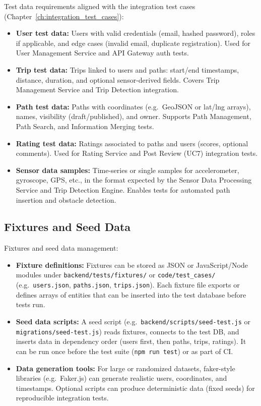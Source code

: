 Test data requirements aligned with the integration test cases (Chapter~\ref{ch:integration_test_cases}):
\begin{itemize}
    \item \textbf{User test data:} Users with valid credentials (email, hashed password), roles if applicable, and edge cases (invalid email, duplicate registration). Used for User Management Service and API Gateway auth tests.
    \item \textbf{Trip test data:} Trips linked to users and paths: start/end timestamps, distance, duration, and optional sensor-derived fields. Covers Trip Management Service and Trip Detection integration.
    \item \textbf{Path test data:} Paths with coordinates (e.g.\ GeoJSON or lat/lng arrays), names, visibility (draft/published), and owner. Supports Path Management, Path Search, and Information Merging tests.
    \item \textbf{Rating test data:} Ratings associated to paths and users (scores, optional comments). Used for Rating Service and Post Review (UC7) integration tests.
    \item \textbf{Sensor data samples:} Time-series or single samples for accelerometer, gyroscope, GPS, etc., in the format expected by the Sensor Data Processing Service and Trip Detection Engine. Enables tests for automated path insertion and obstacle detection.
\end{itemize}

\subsection{Fixtures and Seed Data}
\label{subsec:fixtures_seed_data}%

Fixtures and seed data management:
\begin{itemize}
    \item \textbf{Fixture definitions:} Fixtures can be stored as JSON or JavaScript/Node modules under \texttt{backend/tests/fixtures/} or \texttt{code/test\_cases/} (e.g.\ \texttt{users.json}, \texttt{paths.json}, \texttt{trips.json}). Each fixture file exports or defines arrays of entities that can be inserted into the test database before tests run.
    \item \textbf{Seed data scripts:} A seed script (e.g.\ \texttt{backend/scripts/seed-test.js} or \texttt{migrations/seed-test.js}) reads fixtures, connects to the test DB, and inserts data in dependency order (users first, then paths, trips, ratings). It can be run once before the test suite (\texttt{npm run test}) or as part of CI.
    \item \textbf{Data generation tools:} For large or randomized datasets, faker-style libraries (e.g.\ Faker.js) can generate realistic users, coordinates, and timestamps. Optional scripts can produce deterministic data (fixed seeds) for reproducible integration tests.
\end{itemize}

